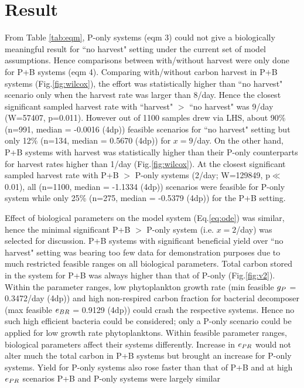 \documentclass[../thesis.tex]{subfiles} %
\begin{document}
\section{Result}
From Table \ref{tab:eqm}, P-only systems (eqm 3) could not give a biologically meaningful result for ``no harvest" setting under the current set of model assumptions.  Hence comparisons between with/without harvest were only done for P+B systems (eqm 4).  Comparing with/without carbon harvest in P+B systems (Fig.\ref{fig:wilcox}), the effort was statistically higher than ``no harvest" scenario only when the harvest rate was larger than 8/day.  Hence the closest significant sampled harvest rate with ``harvest" $>$ ``no harvest" was 9/day (W=57407, p=0.011).  However out of 1100 samples drew via LHS, about 90\% (n=991, median = -0.0016 (4dp)) feasible scenarios for ``no harvest" setting but only 12\% (n=134, median = 0.5670 (4dp)) for $x=9$/day.  On the other hand, P+B systems with harvest was statistically higher than their P-only counterparts for harvest rates higher than 1/day (Fig.\ref{fig:wilcox}).  At the closest significant sampled harvest rate with P+B $>$ P-only systems (2/day; W=129849, p$\ll$0.01), all (n=1100, median = -1.1334 (4dp)) scenarios were feasible for P-only system while only 25\% (n=275, median = -0.5379 (4dp)) for the P+B setting.

Effect of biological parameters on the model system (Eq.\ref{eq:ode}) was similar, hence the minimal significant P+B $>$ P-only system (i.e. $x=2$/day) was selected for discussion.  P+B systems with significant beneficial yield over ``no harvest" setting was bearing too few data for demonstration purposes due to much restricted feasible ranges on all biological parameters.  Total carbon stored in the system for P+B was always higher than that of P-only (Fig.\ref{fig:v2}).  Within the parameter ranges, low phytoplankton growth rate (min feasible $g_P$ = 0.3472/day (4dp)) and high non-respired carbon fraction for bacterial decomposer (max feasible $e_{BR}$ = 0.9129 (4dp)) could crash the respective systems.  Hence no such high efficient bacteria could be considered; only a P-only scenario could be applied for low growth rate phytoplanktons.  Within feasible parameter ranges, biological parameters affect their systems differently.  Increase in $e_{PR}$ would not alter much the total carbon in P+B systems but brought an increase for P-only systems.  Yield for P-only systems also rose faster than that of P+B and at high $e_{PR}$ scenarios P+B and P-only systems were largely similar
\end{document}
